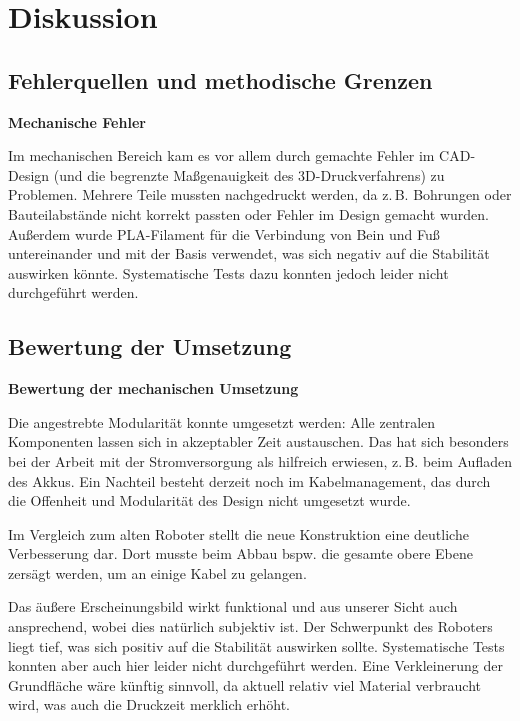 \section{Diskussion}
\label{sec:diskussion}


\subsection{Fehlerquellen und methodische Grenzen}

\textbf{Mechanische Fehler}

Im mechanischen Bereich kam es vor allem durch gemachte Fehler im CAD-Design (und die begrenzte Maßgenauigkeit des 3D-Druckverfahrens) zu Problemen. Mehrere Teile mussten nachgedruckt werden, da z.\,B. Bohrungen oder Bauteilabstände nicht korrekt passten oder Fehler im Design gemacht wurden. 
Außerdem wurde PLA-Filament für die Verbindung von Bein und Fuß untereinander und mit der Basis verwendet, was sich negativ auf die Stabilität auswirken könnte. Systematische Tests dazu konnten jedoch leider nicht durchgeführt werden.

\subsection{Bewertung der Umsetzung}

\textbf{Bewertung der mechanischen Umsetzung}

Die angestrebte Modularität konnte umgesetzt werden: Alle zentralen Komponenten lassen sich in akzeptabler Zeit austauschen. Das hat sich besonders bei der Arbeit mit der Stromversorgung als hilfreich erwiesen, z.\,B. beim Aufladen des Akkus. Ein Nachteil besteht derzeit noch im Kabelmanagement, das durch die Offenheit und Modularität des Design nicht umgesetzt wurde.

Im Vergleich zum alten Roboter stellt die neue Konstruktion eine deutliche Verbesserung dar. Dort musste beim Abbau bspw. die gesamte obere Ebene zersägt werden, um an einige Kabel zu gelangen.

Das äußere Erscheinungsbild wirkt funktional und aus unserer Sicht auch ansprechend, wobei dies natürlich subjektiv ist. Der Schwerpunkt des Roboters liegt tief, was sich positiv auf die Stabilität auswirken sollte. Systematische Tests konnten aber auch hier leider nicht durchgeführt werden. Eine Verkleinerung der Grundfläche wäre künftig sinnvoll, da aktuell relativ viel Material verbraucht wird, was auch die Druckzeit merklich erhöht. 


